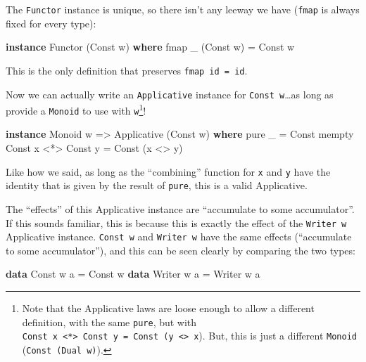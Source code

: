 \documentclass[]{article}
\newenvironment{Shaded}{}{}
\newcommand{\DataTypeTok}[1]{\textcolor[rgb]{0.56,0.13,0.00}{#1}}
\newcommand{\FunctionTok}[1]{\textcolor[rgb]{0.02,0.16,0.49}{#1}}
\newcommand{\KeywordTok}[1]{\textcolor[rgb]{0.00,0.44,0.13}{\textbf{#1}}}
\newcommand{\NormalTok}[1]{#1}
\newcommand{\OtherTok}[1]{\textcolor[rgb]{0.00,0.44,0.13}{#1}}
\begin{document}
The \texttt{Functor} instance is unique, so there isn't any leeway we have
(\texttt{fmap} is always fixed for every type):

\begin{Shaded}
\begin{Highlighting}[]
\KeywordTok{instance} \DataTypeTok{Functor}\NormalTok{ (}\DataTypeTok{Const}\NormalTok{ w) }\KeywordTok{where}
\NormalTok{    fmap _ (}\DataTypeTok{Const}\NormalTok{ w) }\FunctionTok{=} \DataTypeTok{Const}\NormalTok{ w}
\end{Highlighting}
\end{Shaded}

This is the only definition that preserves \texttt{fmap\ id\ =\ id}.

Now we can actually write an \texttt{Applicative} instance for
\texttt{Const\ w}\ldots{}as long as provide a \texttt{Monoid} to use with
\texttt{w}\footnote{Note that the Applicative laws are loose enough to allow a
  different definition, with the same \texttt{pure}, but with
  \texttt{Const\ x\ \textless{}*\textgreater{}\ Const\ y\ =\ Const\ (y\ \textless{}\textgreater{}\ x}).
  But, this is just a different \texttt{Monoid} (\texttt{Const\ (Dual\ w)}).}!

\begin{Shaded}
\begin{Highlighting}[]
\KeywordTok{instance} \DataTypeTok{Monoid}\NormalTok{ w }\OtherTok{=>} \DataTypeTok{Applicative}\NormalTok{ (}\DataTypeTok{Const}\NormalTok{ w) }\KeywordTok{where}
\NormalTok{    pure _              }\FunctionTok{=} \DataTypeTok{Const}\NormalTok{ mempty}
    \DataTypeTok{Const}\NormalTok{ x }\FunctionTok{<*>} \DataTypeTok{Const}\NormalTok{ y }\FunctionTok{=} \DataTypeTok{Const}\NormalTok{ (x }\FunctionTok{<>}\NormalTok{ y)}
\end{Highlighting}
\end{Shaded}

Like how we said, as long as the ``combining'' function for \texttt{x} and
\texttt{y} have the identity that is given by the result of \texttt{pure}, this
is a valid Applicative.

The ``effects'' of this Applicative instance are ``accumulate to some
accumulator''. If this sounds familiar, this is because this is exactly the
effect of the \texttt{Writer\ w} Applicative instance. \texttt{Const\ w} and
\texttt{Writer\ w} have the same effects (``accumulate to some accumulator''),
and this can be seen clearly by comparing the two types:

\begin{Shaded}
\begin{Highlighting}[]
\KeywordTok{data} \DataTypeTok{Const}\NormalTok{  w a }\FunctionTok{=} \DataTypeTok{Const}\NormalTok{  w}
\KeywordTok{data} \DataTypeTok{Writer}\NormalTok{ w a }\FunctionTok{=} \DataTypeTok{Writer}\NormalTok{ w a}
\end{Highlighting}
\end{Shaded}
\end{document}
